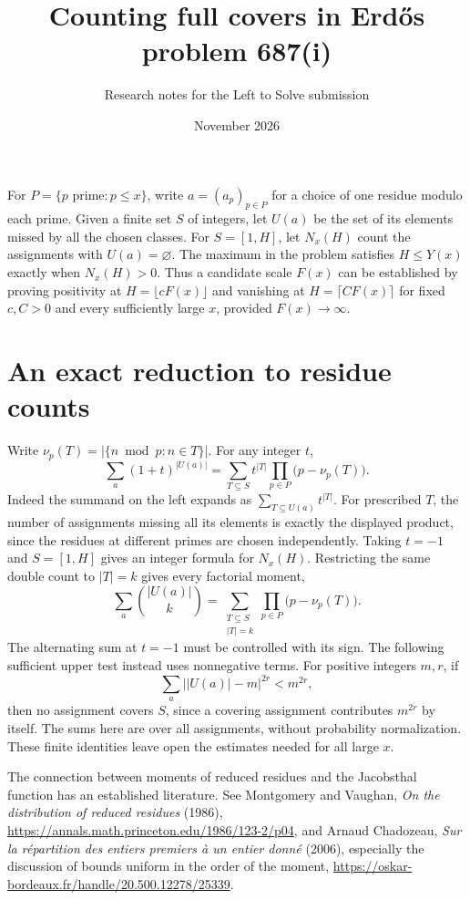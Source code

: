 \documentclass[11pt]{article}
\title{Counting full covers in Erd\H{o}s problem 687(i)}
\author{Research notes for the Left to Solve submission}
\date{November 2026}
\begin{document}
\maketitle

For $P=\{p\text{ prime}:p\le x\}$, write $a=(a_p)_{p\in P}$ for a choice of
one residue modulo each prime. Given a finite set $S$ of integers, let
$U(a)$ be the set of its elements missed by all the chosen classes. For
$S=[1,H]$, let $N_x(H)$ count the assignments with $U(a)=\varnothing$.
The maximum in the problem satisfies $H\le Y(x)$ exactly when $N_x(H)>0$.
Thus a candidate scale $F(x)$ can be established by proving positivity at
$H=\lfloor cF(x)\rfloor$ and vanishing at $H=\lceil CF(x)\rceil$ for fixed
$c,C>0$ and every sufficiently large $x$, provided $F(x)\to\infty$.

\section*{An exact reduction to residue counts}
Write $\nu_p(T)=|\{n\bmod p:n\in T\}|$. For any integer $t$,
\[
 \sum_a(1+t)^{|U(a)|}
 =\sum_{T\subseteq S}t^{|T|}\prod_{p\in P}\bigl(p-\nu_p(T)\bigr).
\]
Indeed the summand on the left expands as
$\sum_{T\subseteq U(a)}t^{|T|}$. For prescribed $T$, the number of
assignments missing all its elements is exactly the displayed product,
since the residues at different primes are chosen independently. Taking
$t=-1$ and $S=[1,H]$ gives an integer formula for $N_x(H)$. Restricting
the same double count to $|T|=k$ gives every factorial moment,
\[
 \sum_a \binom{|U(a)|}{k}
 =\sum_{\substack{T\subseteq S\\ |T|=k}}\prod_{p\in P}\bigl(p-\nu_p(T)\bigr).
\]
The alternating sum at $t=-1$ must be controlled with its sign.
The following sufficient upper test instead uses nonnegative terms. For
positive integers $m,r$, if
\[
 \sum_a \bigl||U(a)|-m\bigr|^{2r}<m^{2r},
\]
then no assignment covers $S$, since a covering assignment contributes
$m^{2r}$ by itself. The sums here are over all assignments, without
probability normalization. These finite identities leave open the estimates
needed for all large $x$.

The connection between moments of reduced residues and the Jacobsthal
function has an established literature. See Montgomery and Vaughan,
\emph{On the distribution of reduced residues} (1986),
\url{https://annals.math.princeton.edu/1986/123-2/p04}, and Arnaud
Chadozeau, \emph{Sur la répartition des entiers premiers à un entier
donné} (2006), especially the discussion of bounds uniform in the order
of the moment, \url{https://oskar-bordeaux.fr/handle/20.500.12278/25339}.
\end{document}
